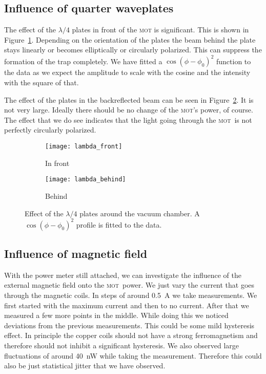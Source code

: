 \documentclass[11pt, english, fleqn, DIV=15, headinclude, BCOR=2cm]{scrreprt}
\newcommand\mot{\textsc{mot}}
\begin{document}
\subsection{Influence of quarter waveplates}

The effect of the $\lambda/4$ plates in front of the \mot{} is significant.
This is shown in Figure~\ref{fig:lambda_front}. Depending on the orientation of
the plates the beam behind the plate stays linearly or becomes elliptically or
circularly polarized. This can suppress the formation of the trap completely.
We have fitted a $\cos(\phi - \phi_0)^2$ function to the data as we expect the
amplitude to scale with the cosine and the intensity with the square of that.

The effect of the plates in the backreflected beam can be seen in
Figure~\ref{fig:lambda_behind}. It is not very large. Ideally there should be
no change of the \mot's power, of course. The effect that we do see indicates
that the light going through the \mot\ is not perfectly circularly polarized.

\begin{figure}
    \centering
    \begin{subfigure}[c]{0.48\linewidth}
    \centering
    \texttt{[image: lambda\_front]}
    \caption{%
        In front
    }
    \label{fig:lambda_front}
    \end{subfigure}
    \hfill
    \begin{subfigure}[c]{0.48\linewidth}
    \centering
    \texttt{[image: lambda\_behind]}
    \caption{%
        Behind
    }
    \label{fig:lambda_behind}
    \end{subfigure}
    \caption{%
        Effect of the $\lambda/4$ plates around the vacuum chamber.
        A $\cos(\phi - \phi_0)^2$ profile is fitted to the data.
    }
    \label{fig:}
\end{figure}

\subsection{Influence of magnetic field}

With the power meter still attached, we can investigate the influence of the
external magnetic field onto the \mot\ power. We just vary the current that
goes through the magnetic coils. In steps of around \SI{0.5}{\ampere} we take
measurements. We first started with the maximum current and then to no current.
After that we measured a few more points in the middle. While doing this we
noticed deviations from the previous measurements. This could be some mild
hysteresis effect. In principle the copper coils should not have a strong
ferromagnetism and therefore should not inhibit a significant hysteresis. We
also observed large fluctuations of around \SI{40}{\nano\watt} while taking the
measurement. Therefore this could also be just statistical jitter that we have
observed.
\end{document}
